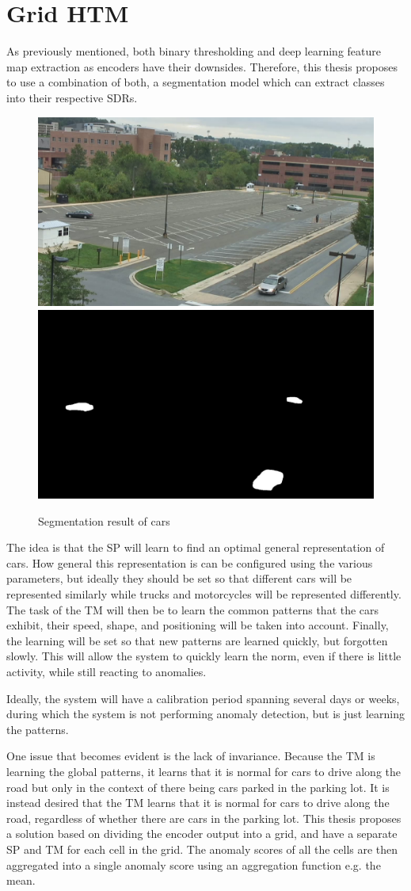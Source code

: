 \chapter{Grid HTM}
As previously mentioned, both binary thresholding and deep learning feature map extraction as encoders have their downsides. Therefore, this thesis proposes to use a combination of both, a segmentation model which can extract classes into their respective SDRs.
\begin{figure}[H]
    \centering
    \includegraphics[width=.5\textwidth]{resources/methodology/original.png}\hfill
    \includegraphics[width=.5\textwidth]{resources/methodology/car_segmentation.png}
    \caption{Segmentation result of cars}
    \label{fig:figure3}
\end{figure}
The idea is that the SP will learn to find an optimal general representation of cars. How general this representation is can be configured using the various parameters, but ideally they should be set so that different cars will be represented similarly while trucks and motorcycles will be represented differently. The task of the TM will then be to learn the common patterns that the cars exhibit, their speed, shape, and positioning will be taken into account. Finally, the learning will be set so that new patterns are learned quickly, but forgotten slowly. This will allow the system to quickly learn the norm, even if there is little activity, while still reacting to anomalies. \par
Ideally, the system will have a calibration period spanning several days or weeks, during which the system is not performing anomaly detection, but is just learning the patterns.\par
One issue that becomes evident is the lack of invariance. Because the TM is learning the global patterns, it learns that it is normal for cars to drive along the road but only in the context of there being cars parked in the parking lot. It is instead desired that the TM learns that it is normal for cars to drive along the road, regardless of whether there are cars in the parking lot. This thesis proposes a solution based on dividing the encoder output into a grid, and have a separate SP and TM for each cell in the grid. The anomaly scores of all the cells are then aggregated into a single anomaly score using an aggregation function e.g. the mean.
